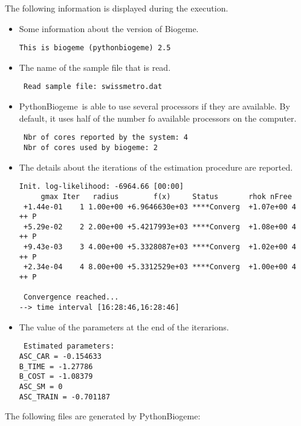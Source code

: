 \documentclass[12pt,a4paper]{article}
\newcommand{\PBIOGEME}{PythonBiogeme}
\begin{document}
The following information is displayed during the execution.
\begin{itemize}
\item Some information about the version of Biogeme.
\begin{lstlisting}
This is biogeme (pythonbiogeme) 2.5
\end{lstlisting}
\item The name of the sample file that is read.
\begin{lstlisting}
 Read sample file: swissmetro.dat
\end{lstlisting}
\item \PBIOGEME\ is able to use several processors if they are
  available. By default, it uses half of the number fo available
  processors on the computer. 
\begin{lstlisting}
 Nbr of cores reported by the system: 4
 Nbr of cores used by biogeme: 2
\end{lstlisting}
\item The details about the iterations of the estimation procedure are
  reported. 
\begin{lstlisting}[style=tiny]
 Init. log-likelihood: -6964.66 [00:00]
     gmax Iter   radius        f(x)     Status       rhok nFree
 +1.44e-01    1 1.00e+00 +6.9646630e+03 ****Converg  +1.07e+00 4  ++ P
 +5.29e-02    2 2.00e+00 +5.4217993e+03 ****Converg  +1.08e+00 4  ++ P
 +9.43e-03    3 4.00e+00 +5.3328087e+03 ****Converg  +1.02e+00 4  ++ P
 +2.34e-04    4 8.00e+00 +5.3312529e+03 ****Converg  +1.00e+00 4  ++ P

 Convergence reached...
--> time interval [16:28:46,16:28:46]
\end{lstlisting}
\item The value of the parameters at the end of the iterarions.
\begin{lstlisting}
 Estimated parameters: 
ASC_CAR = -0.154633
B_TIME = -1.27786
B_COST = -1.08379
ASC_SM = 0
ASC_TRAIN = -0.701187
\end{lstlisting}
\end{itemize}
The following files are generated by \PBIOGEME:
\end{document}
